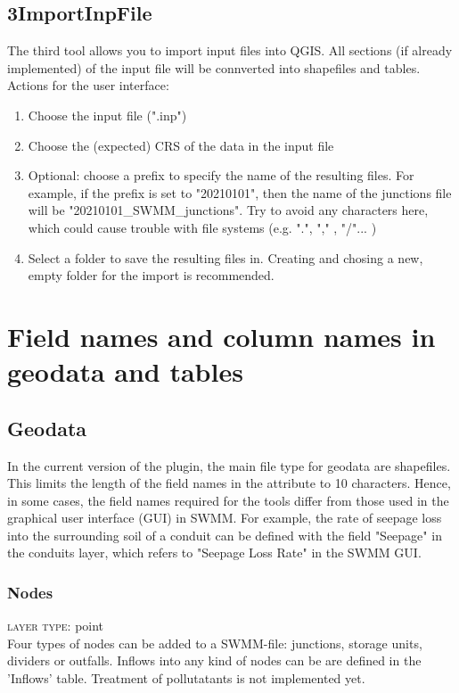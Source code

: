 \documentclass[10pt,a4paper,oneside]{scrbook}
\begin{document}
\section{3\textunderscore ImportInpFile}
The third tool allows you to import input files into QGIS. All sections (if already implemented) of the input file will be connverted into shapefiles and tables. Actions for the user interface:
\begin{enumerate}
	\setlength\itemsep{0pt}
	\item Choose the input file (".inp")
	\item Choose the (expected) CRS of the data in the input file
	\item Optional: choose a prefix to specify the name of the resulting files. For example, if the prefix is set to "20210101", then the name of the junctions file will be "20210101\_SWMM\_junctions". Try to avoid any characters here, which could cause trouble with file systems (e.g. ".", "," , "/"... )
	\item Select a folder to save the resulting files in. Creating and chosing a new, empty folder for the import is recommended.
\end{enumerate}


\chapter{Field names and column names in geodata and tables}

\section{Geodata}
In the current version of the plugin, the main file type for geodata are shapefiles. This limits the length of the field names in the attribute to 10 characters. Hence, in some cases, the field names required for the tools differ from those used in the graphical user interface (GUI) in SWMM. For example, the rate of seepage loss into the surrounding soil of a conduit can be defined with the field "Seepage" in the conduits layer, which refers to "Seepage Loss Rate" in the SWMM GUI. %


\subsection{Nodes}
\textsc{layer type}: point \\
Four types of nodes can be added to a SWMM-file:
junctions, storage units, dividers or outfalls. Inflows into any kind of nodes can be are defined in the 'Inflows' table. Treatment of pollutatants is not implemented yet.
\end{document}
